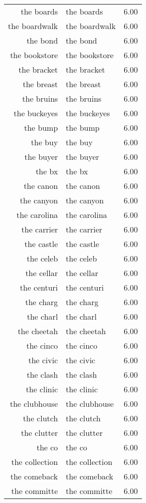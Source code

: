 \begin{table}[ht]
\begin{tabular}{rlr}
  the boards & the boards & 6.00 \\ 
  the boardwalk & the boardwalk & 6.00 \\ 
  the bond & the bond & 6.00 \\ 
  the bookstore & the bookstore & 6.00 \\ 
  the bracket & the bracket & 6.00 \\ 
  the breast & the breast & 6.00 \\ 
  the bruins & the bruins & 6.00 \\ 
  the buckeyes & the buckeyes & 6.00 \\ 
  the bump & the bump & 6.00 \\ 
  the buy & the buy & 6.00 \\ 
  the buyer & the buyer & 6.00 \\ 
  the bx & the bx & 6.00 \\ 
  the canon & the canon & 6.00 \\ 
  the canyon & the canyon & 6.00 \\ 
  the carolina & the carolina & 6.00 \\ 
  the carrier & the carrier & 6.00 \\ 
  the castle & the castle & 6.00 \\ 
  the celeb & the celeb & 6.00 \\ 
  the cellar & the cellar & 6.00 \\ 
  the centuri & the centuri & 6.00 \\ 
  the charg & the charg & 6.00 \\ 
  the charl & the charl & 6.00 \\ 
  the cheetah & the cheetah & 6.00 \\ 
  the cinco & the cinco & 6.00 \\ 
  the civic & the civic & 6.00 \\ 
  the clash & the clash & 6.00 \\ 
  the clinic & the clinic & 6.00 \\ 
  the clubhouse & the clubhouse & 6.00 \\ 
  the clutch & the clutch & 6.00 \\ 
  the clutter & the clutter & 6.00 \\ 
  the co & the co & 6.00 \\ 
  the collection & the collection & 6.00 \\ 
  the comeback & the comeback & 6.00 \\ 
  the committe & the committe & 6.00 \\ 

\end{tabular}
\end{table}
